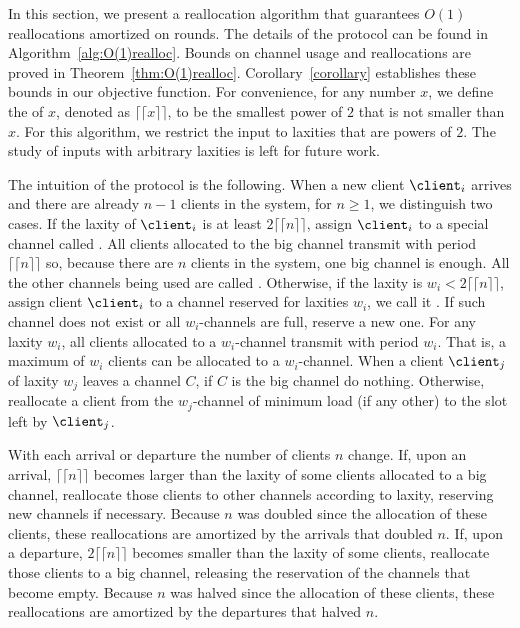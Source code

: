 

In this section, we present a reallocation algorithm that guarantees $O(1)$ reallocations amortized on rounds.
The details of the protocol can be found in Algorithm~\ref{alg:O(1)realloc}. 
Bounds on channel usage and reallocations are proved in Theorem~\ref{thm:O(1)realloc}. 
Corollary~\ref{corollary} establishes these bounds in our objective function. 
For convenience, for any number $x$, we define the  of $x$, denoted as $\lceil\lceil x \rceil \rceil$, to be the smallest power of $2$ that is not smaller than $x$.
For this algorithm, we restrict the input to laxities that are powers of $2$. The study of inputs with arbitrary laxities is left for future work.

The intuition of the protocol is the following. 
When a new client $\client_i$ arrives and there are already $n-1$ clients in the system, for $n\geq1$, we distinguish two cases.
If the laxity of $\client_i$ is at least $2\lceil\lceil n \rceil\rceil$, assign $\client_i$ to a special channel called . All clients allocated to the big channel transmit with period $\lceil\lceil n \rceil\rceil$ so, because there are $n$ clients in the system, one big channel is enough. All the other channels being used are called .
Otherwise, if the laxity is $w_i<2\lceil\lceil n \rceil\rceil$, assign client $\client_i$ to a channel reserved for laxities $w_i$, we call it . If such channel does not exist or all $w_i$-channels are full, reserve a new one.
For any laxity $w_i$, all clients allocated to a $w_i$-channel transmit with period $w_i$. That is, a maximum of $w_i$ clients can be allocated to a $w_i$-channel.
When a client $\client_j$ of laxity $w_j$ leaves a channel $C$, if $C$ is the big channel do nothing.
Otherwise, reallocate a client from the $w_j$-channel of minimum load (if any other) to the slot left by $\client_j$.

With each arrival or departure the number of clients $n$ change.
If, upon an arrival, $\lceil\lceil n\rceil\rceil$ becomes larger than the laxity of some clients allocated to a big channel, reallocate those clients to other channels according to laxity, reserving new channels if necessary.
Because $n$ was doubled since the allocation of these clients, these reallocations are amortized by the arrivals that doubled $n$.
If, upon a departure, $2\lceil\lceil n\rceil\rceil$ becomes smaller than the laxity of some clients, reallocate those clients to a big channel, releasing the reservation of the channels that become empty.
Because $n$ was halved since the allocation of these clients, these reallocations are amortized by the departures that halved $n$.



